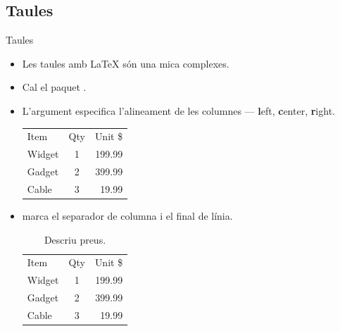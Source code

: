 \subsection{Taules}
\begin{frame}[fragile]{Taules}
\begin{itemize}
\item Les taules amb \LaTeX{} són una mica complexes.
\item Cal el paquet .
\item L'argument especifica l'alineament de les columnes --- \textbf{l}eft, \textbf{c}enter, \textbf{r}ight.
\begin{exampletwouptiny2}
\begin{tabular}{lcr} 
    Item   & Qty & Unit \$ \\
    Widget & 1   & 199.99  \\
    Gadget & 2   & 399.99  \\
    Cable  & 3   & 19.99   \\
\end{tabular}
\end{exampletwouptiny2}
\item \keystrokebftt{\&} marca el separador de columna i \keystrokebftt{\bs\bs} el final de línia. 
\begin{exampletwouptiny2}
\begin{table}  
    \centering %
    \begin{tabular}{lcr}
        Item   & Qty & Unit \$ \\
        Widget & 1   & 199.99  \\
        Gadget & 2   & 399.99  \\
        Cable  & 3   & 19.99   \\
    \end{tabular}
    \caption{Descriu preus.}
    \label{taula:items}
\end{table}
\end{exampletwouptiny2}
\end{itemize}
\end{frame}

